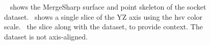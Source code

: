 \begin{figure}
    \centering
    \caption{~\protect{} shows the MergeSharp surface and point skeleton of the socket dataset.~\protect{} shows a single slice of the YZ axis using the hsv color scale.~\protect{} the slice along with the dataset, to provide context. The dataset is not axis-aligned.}
    \label{fig:intake}
\end{figure}
